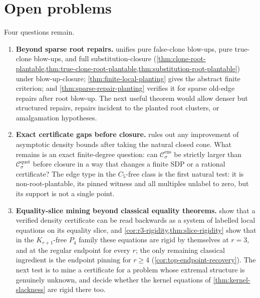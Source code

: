 \documentclass[11pt]{article}
\theoremstyle{definition}
\newcommand{\C}{\mathcal{C}}
\begin{document}
\section{Open problems}

Four questions remain.

\begin{enumerate}[label=\textup{(\arabic*)}, leftmargin=2.8em]
  \item \textbf{Beyond sparse root repairs.}
   unifies pure false-clone blow-ups, pure true-clone
  blow-ups, and full substitution-closure
  (\cref{thm:clone-root-plantable,thm:true-clone-root-plantable,thm:substitution-root-plantable})
  under blow-up-closure; \cref{thm:finite-local-planting} gives the abstract finite criterion; and
  \cref{thm:sparse-repair-planting} verifies it for sparse old-edge repairs after
  root blow-up.  The next useful theorem would allow denser but structured repairs,
  repairs incident to the planted root clusters, or amalgamation hypotheses.

  \item \textbf{Exact certificate gaps before closure.}
   rules out any improvement of asymptotic density
  bounds after taking the natural closed cone.  What remains is an exact finite-degree
  question: can $\C^{\mathrm{ens}}_\sigma$ be strictly larger than
  $\C^{\mathrm{quot}}_\sigma$ before closure in a way that changes a finite SDP or a
  rational certificate?  The edge type in the $C_5$-free class is the first natural test:
  it is non-root-plantable, its pinned witness and all multiples unlabel to zero, but its
  support is not a single point.

  \item \textbf{Equality-slice mining beyond classical equality theorems.}
   show that a verified
  density certificate can be read backwards as a system of labelled local equations on its
  equality slice, and \cref{cor:r3-rigidity,thm:slice-rigidity} show that in the
  $K_{r+1}$-free $P_4$ family these equations are rigid by themselves at $r=3$, and at
  the regular endpoint for every $r$; the only remaining classical ingredient is the
  endpoint pinning for $r\ge4$ (\cref{cor:top-endpoint-recovery}).  The next test is to
  mine a certificate for a problem whose extremal structure is genuinely unknown, and
  decide whether the kernel equations of \cref{thm:kernel-slackness} are rigid there
  too.


\end{enumerate}
\end{document}
